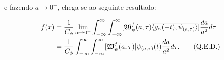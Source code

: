 e fazendo $a \rightarrow 0^{+}$, chega-se ao seguinte resultado:

\begin{align*}
f(x) &= \frac{1}{C_{\phi}} \lim_{\alpha \rightarrow 0^{+}} \int_{-\infty}^{\infty}\int_{-\infty}^{\infty}[\mathfrak{W}_{\psi}^{f}(a, \tau)\overline{\langle g_{\alpha}(-t), \psi_{(a, \tau)} \rangle}]\frac{d a}{a^{2}}d\tau \\
&= \frac{1}{C_{\phi}} \int_{-\infty}^{\infty}\int_{-\infty}^{\infty}[\mathfrak{W}_{\psi}^{f}(a, \tau)] \psi_{(a, \tau)}(t)\frac{d a}{a^{2}}d\tau.  \tag*{\text{(Q.E.D.)}}
\end{align*}








